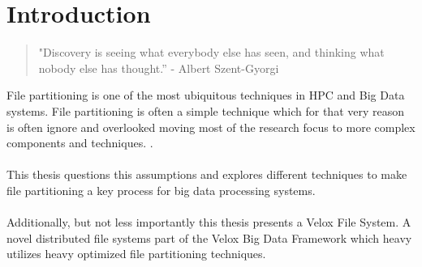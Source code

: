 \section{Introduction}
\begin{verse}
"Discovery is seeing what everybody else has seen, and thinking what nobody else has thought.” - Albert Szent-Gyorgi
\end{verse}
File partitioning is one of the most ubiquitous techniques in HPC and Big Data systems. File partitioning is often a simple technique which for that very reason is often ignore and overlooked moving most of the research focus to more complex components and techniques.
. \\ \\
This thesis questions this assumptions and explores different techniques to make file partitioning a key process for big data processing systems.
\\ \\
Additionally, but not less importantly this thesis presents a Velox File System. A novel distributed file systems part of the Velox Big Data Framework which heavy utilizes heavy optimized file partitioning techniques. 
\\ 

